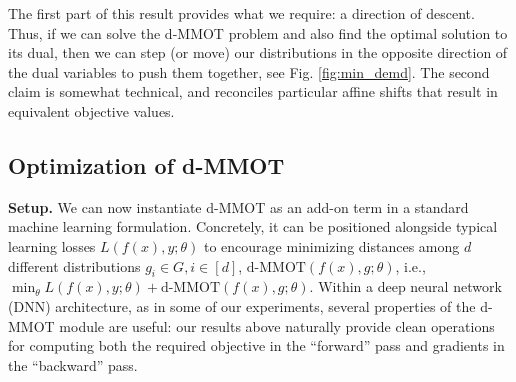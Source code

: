 \begin{remark} The first part of this result provides what we require: a direction of descent. 
Thus, if we can solve the d-MMOT problem and also find the optimal solution to its dual, 
then we can step (or move) our distributions in the opposite direction of the dual variables
to push them together, {\color{blue}see Fig. \ref{fig:min_demd}}.
The second claim is somewhat technical, and reconciles particular affine shifts that result in equivalent objective values.
\end{remark}

{\color{blue} 
\subsection{Optimization of d-MMOT}\label{sec:dual}

{\bf Setup.} 
We can now instantiate d-MMOT as an add-on term in a standard machine learning formulation. Concretely, it can be positioned alongside typical learning losses $L(f(x),y;\theta)$ to encourage minimizing distances among $d$ different distributions $g_i\in G, i \in [d]$, $\text{d-MMOT}(f(x),g;\theta)$, i.e., 
$\min_{\theta} L(f(x),y;\theta) + \text{d-MMOT}(f(x),g;\theta)$. 
Within a deep neural network (DNN) architecture, as in some of our experiments,  
several properties of the d-MMOT module are useful:
our results above naturally provide clean operations for computing both the required objective in the ``forward'' pass and gradients in the ``backward'' pass.
}


